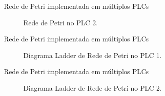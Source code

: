 \begin{frame}{Rede de Petri implementada em múltiplos PLCs}
  \begin{figure}[ht]
       \begin{minipage}[b]{0.45\linewidth}
           \centering
           \caption{Rede de Petri no PLC 1.}
           \label{fig:a}
       \end{minipage}
       \hspace{0.5cm}
       \begin{minipage}[b]{0.45\linewidth}
           \centering
           \caption{Rede de Petri no PLC 2.}
           \label{fig:b}
       \end{minipage}
   \end{figure}
\end{frame}




\begin{frame}{Rede de Petri implementada em múltiplos PLCs}
   \begin{figure}[ht]
       \begin{minipage}[b]{0.45\linewidth}
         \centering
       \end{minipage}
       \hspace{0.5cm}
       \begin{minipage}[b]{0.45\linewidth}
           \centering
       \end{minipage}
  \caption{Diagrama Ladder de Rede de Petri no PLC 1.}
   \end{figure}
\end{frame}


\begin{frame}{Rede de Petri implementada em múltiplos PLCs}
   \begin{figure}[ht]
       \begin{minipage}[b]{0.45\linewidth}
         \centering
       \end{minipage}
       \hspace{0.5cm}
       \begin{minipage}[b]{0.45\linewidth}
           \centering
       \end{minipage}
  \caption{Diagrama Ladder de Rede de Petri no PLC 2.}
   \end{figure}
 \end{frame}

